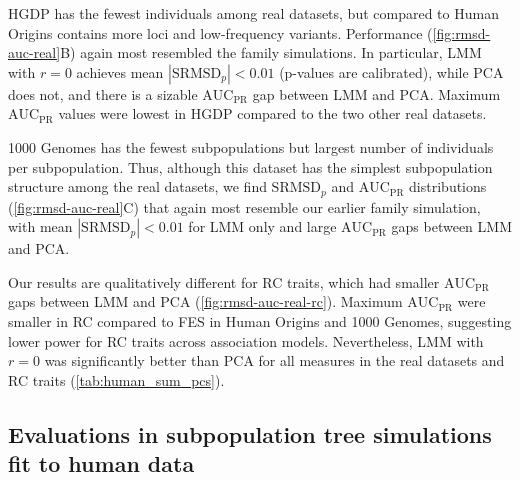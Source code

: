 \documentclass[11pt]{article}
\newcommand{\rmsd}{\text{SRMSD}_p}
\newcommand{\auc}{\text{AUC}_\text{PR}}
\begin{document}
\begin{linenumbers}
HGDP has the fewest individuals among real datasets, but compared to Human Origins contains more loci and low-frequency variants.
Performance (\cref{fig:rmsd-auc-real}B) again most resembled the family simulations.
In particular, LMM with $r=0$ achieves mean $|\rmsd| < 0.01$ (p-values are calibrated), while PCA does not, and there is a sizable $\auc$ gap between LMM and PCA.
Maximum $\auc$ values were lowest in HGDP compared to the two other real datasets.

1000 Genomes has the fewest subpopulations but largest number of individuals per subpopulation.
Thus, although this dataset has the simplest subpopulation structure among the real datasets, we find $\rmsd$ and $\auc$ distributions (\cref{fig:rmsd-auc-real}C) that again most resemble our earlier family simulation, with mean $|\rmsd| < 0.01$ for LMM only and large $\auc$ gaps between LMM and PCA.

Our results are qualitatively different for RC traits, which had smaller $\auc$ gaps between LMM and PCA (\cref{fig:rmsd-auc-real-rc}).
Maximum $\auc$ were smaller in RC compared to FES in Human Origins and 1000 Genomes, suggesting lower power for RC traits across association models.
Nevertheless, LMM with $r=0$ was significantly better than PCA for all measures in the real datasets and RC traits (\cref{tab:human_sum_pcs}).

\subsection{Evaluations in subpopulation tree simulations fit to human data}


\end{linenumbers}
\end{document}
